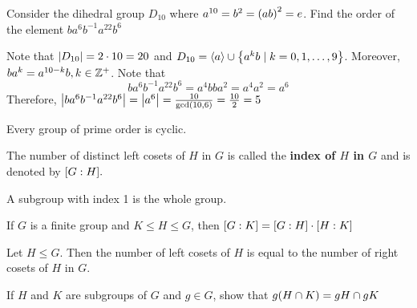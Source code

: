 \begin{exercise}
    Consider the dihedral group $D_{10}$ where $a^{10} = b^2 = \qty(ab)^2 = e$. Find the order of the element $ba^6b^{-1}a^{22}b^6$
\end{exercise}

\begin{solution}
    Note that $\qty|D_{10}| = 2 \cdot 10 = 20$ and $D_{10} = \langle a \rangle \cup \qty{a^kb \mid k = 0, 1, \ldots, 9}$. Moreover, $ba^k = a^{10 -k}b, k \in \mathbb{Z}^+$. Note that
    \[ ba^6b^{-1}a^{22}b^6 = a^4bba^2 = a^4a^2 = a^6 \]
    Therefore, $\qty|ba^6b^{-1}a^{22}b^6| = \qty|a^6| = \frac{10}{\text{gcd}\qty(10, 6)} = \frac{10}{2} = 5$
\end{solution}

\begin{corollary}
    Every group of prime order is cyclic.
\end{corollary}

\begin{definition}
    The number of distinct left cosets of $H$ in $G$ is called the \textbf{index of $H$ in $G$} and is denoted by $\qty[G : H].$
\end{definition}

\begin{remark}
    A subgroup with index 1 is the whole group.
\end{remark}

\begin{corollary}
    If $G$ is a finite group and $K \leq H \leq G$, then $\qty[G : K] = \qty[G : H] \cdot \qty[H : K]$
\end{corollary}

\begin{theorem}
    Let $H \leq G$. Then the number of left cosets of $H$ is equal to the number of right cosets of $H$ in $G$.
\end{theorem}

\begin{exercise}
    If $H$ and $K$ are subgroups of $G$ and $g \in G$, show that $g \qty(H \cap K) = gH \cap gK$
\end{exercise}

